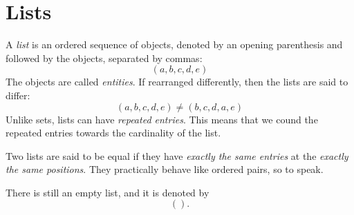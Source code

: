 \section{Lists}
A \emph{list} is an ordered sequence of objects, denoted by an opening parenthesis and followed by the objects, separated by commas: 
$$
(a,b,c,d,e)
$$
The objects are called \emph{entities}. If rearranged differently, then the lists are said to differ: 
$$
(a,b,c,d,e)\ne(b,c,d,a,e)
$$
Unlike sets, lists can have \emph{repeated entries}. This means that we cound the repeated entries towards the cardinality of the list. 

Two lists are said to be equal if they have \emph{exactly the same entries} at the \emph{exactly the same positions}. They practically behave like ordered pairs, so to speak. 

There is still an empty list, and it is denoted by 
$$
().
$$


